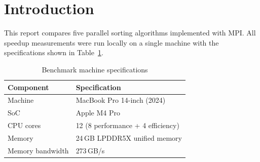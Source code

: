 \section{Introduction}

This report compares five parallel sorting algorithms implemented with MPI.
All speedup measurements were run locally on a single machine with the
specifications shown in Table~\ref{tab:machine-specs}.

\begin{table}[htbp]
    \centering
    \caption{Benchmark machine specifications}
    \label{tab:machine-specs}
    \begin{tabular}{@{}ll@{}}
        \toprule
        \textbf{Component} & \textbf{Specification} \\
        \midrule
        Machine          & MacBook Pro 14-inch (2024) \\
        SoC              & Apple M4 Pro \\
        CPU cores        & 12 (8 performance + 4 efficiency) \\
        Memory           & 24\,GB LPDDR5X unified memory \\
        Memory bandwidth & 273\,GB/s \\
        \bottomrule
    \end{tabular}
\end{table}
